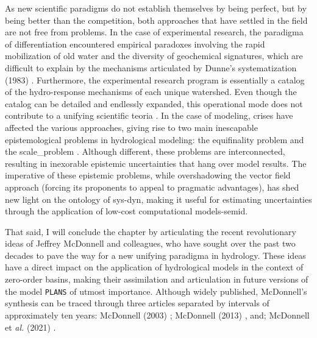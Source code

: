 \documentclass[./main_en.tex]{subfiles}
\begin{document}
\par As new scientific paradigms do not establish themselves by being perfect, but by being better than the competition, both approaches that have settled in the field are not free from problems. In the case of experimental research, the \gls{paradigma} of differentiation encountered empirical paradoxes involving the rapid mobilization of old water and the diversity of geochemical signatures, which are difficult to explain by the mechanisms articulated by Dunne's systematization (1983) \cite{Dunne1983}. Furthermore, the experimental research program is essentially a catalog of the \gls{hydro-response} mechanisms of each unique watershed. Even though the catalog can be detailed and endlessly expanded, this operational mode does not contribute to a unifying scientific \gls{teoria} \cite{Mcdonnell2003a}. In the case of modeling, crises have affected the various approaches, giving rise to two main inescapable epistemological problems in hydrological modeling: the equifinality problem and the \gls{scale_problem} \cite{Beven1996a}. Although different, these problems are interconnected, resulting in inexorable epistemic uncertainties that hang over model results. The imperative of these epistemic problems, while overshadowing the vector field approach (forcing its proponents to appeal to pragmatic advantages), has shed new light on the ontology of \gls{sys-dyn}, making it useful for estimating uncertainties through the application of low-cost computational \gls{models-semid}.

\par That said, I will conclude the chapter by articulating the recent revolutionary ideas of Jeffrey McDonnell and colleagues, who have sought over the past two decades to pave the way for a new unifying \gls{paradigma} in \gls{hydrology}. These ideas have a direct impact on the application of hydrological models in the context of zero-order basins, making their assimilation and articulation in future versions of the \gls{model} \texttt{PLANS} of utmost importance. Although widely published, McDonnell's synthesis can be traced through three articles separated by intervals of approximately ten years: McDonnell (2003) \cite{Mcdonnell2003a}; McDonnell (2013) \cite{Mcdonnell2013}, and; McDonnell et \textit{al.} (2021) \cite{mcdonnell2021}.
\end{document}
